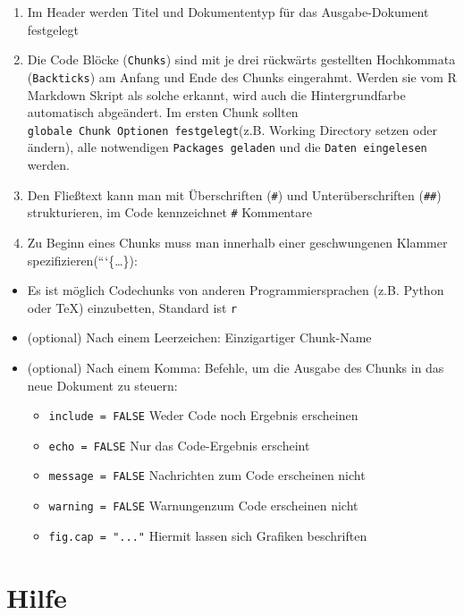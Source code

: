 \documentclass[
  ngerman,
]{book}
\providecommand{\tightlist}{%
  \setlength{\itemsep}{0pt}\setlength{\parskip}{0pt}}
\begin{document}
\begin{enumerate}
\def\labelenumi{\arabic{enumi}.}
\tightlist
\item
  Im Header werden Titel und Dokumententyp für das Ausgabe-Dokument festgelegt
\item
  Die Code Blöcke (\texttt{Chunks}) sind mit je drei rückwärts gestellten Hochkommata (\texttt{Backticks}) am Anfang und Ende des Chunks eingerahmt. Werden sie vom R Markdown Skript als solche erkannt, wird auch die Hintergrundfarbe automatisch abgeändert. Im ersten Chunk sollten \texttt{globale\ Chunk\ Optionen\ festgelegt}(z.B. Working Directory setzen oder ändern), alle notwendigen \texttt{Packages\ geladen} und die \texttt{Daten\ eingelesen} werden.
\item
  Den Fließtext kann man mit Überschriften (\texttt{\#}) und Unterüberschriften (\texttt{\#\#}) strukturieren, im Code kennzeichnet \texttt{\#}
  Kommentare
\item
  Zu Beginn eines Chunks muss man innerhalb einer geschwungenen Klammer spezifizieren(```\{\ldots\}):
\end{enumerate}

\begin{itemize}
\item
  Es ist möglich Codechunks von anderen Programmiersprachen (z.B. Python oder TeX) einzubetten, Standard ist \texttt{r}
\item
  (optional) Nach einem Leerzeichen: Einzigartiger Chunk-Name
\item
  (optional) Nach einem Komma: Befehle, um die Ausgabe des Chunks in das neue Dokument zu steuern:

  \begin{itemize}
  \tightlist
  \item
    \texttt{include\ =\ FALSE} Weder Code noch Ergebnis erscheinen
  \item
    \texttt{echo\ =\ FALSE} Nur das Code-Ergebnis erscheint
  \item
    \texttt{message\ =\ FALSE} Nachrichten zum Code erscheinen nicht
  \item
    \texttt{warning\ =\ FALSE} Warnungenzum Code erscheinen nicht
  \item
    \texttt{fig.cap\ =\ "..."} Hiermit lassen sich Grafiken beschriften
  \end{itemize}
\end{itemize}

\section{Hilfe}\label{hilfe}
\end{document}
